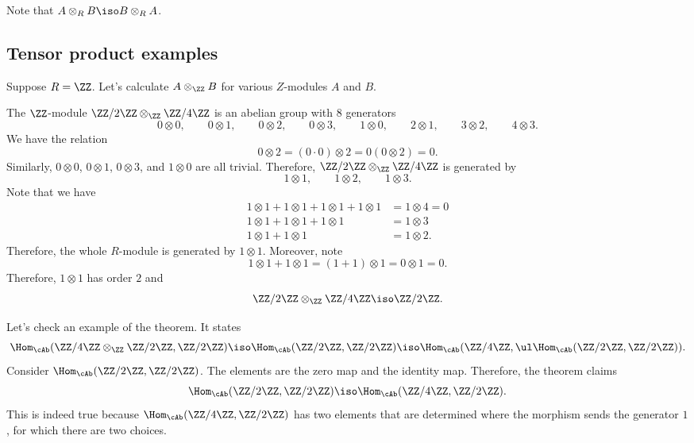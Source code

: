 \documentclass{standalone}
\begin{document}
Note that \(A \otimes_R B \iso B \otimes_R A\).

\subsection{Tensor product examples}
Suppose \(R = \ZZ\). Let's calculate \(A \otimes_\ZZ B\) for various
\(Z\)-modules \(A\) and \(B\).

\begin{example}
  The \(\ZZ\)-module \(\ZZ/2\ZZ \otimes_\ZZ \ZZ/4\ZZ\) is an abelian group
  with \(8\) generators
  \[
    0 \otimes 0, \qquad
    0 \otimes 1, \qquad
    0 \otimes 2, \qquad
    0 \otimes 3, \qquad
    1 \otimes 0, \qquad
    2 \otimes 1, \qquad
    3 \otimes 2, \qquad
    4 \otimes 3.
  \]
  We have the relation
  \[
    0 \otimes 2 = (0 \cdot 0) \otimes 2 = 0 (0 \otimes 2) = 0.
  \]
  Similarly, \(0 \otimes 0\), \(0 \otimes 1\), \(0 \otimes 3\), and
  \(1 \otimes 0\) are all trivial.
  Therefore, \(\ZZ/2\ZZ \otimes_\ZZ \ZZ/4\ZZ\) is generated by
  \[
    1 \otimes 1, \qquad
    1 \otimes 2, \qquad
    1 \otimes 3.
  \]
  Note that we have
  \begin{align*}
    1 \otimes 1 + 1 \otimes 1 + 1 \otimes 1 + 1 \otimes 1 &= 1 \otimes 4 = 0 \\
    1 \otimes 1 + 1 \otimes 1 + 1 \otimes 1 &= 1 \otimes 3 \\
    1 \otimes 1 + 1 \otimes 1 &= 1 \otimes 2.
  \end{align*}
  Therefore, the whole \(R\)-module is generated by \(1 \otimes 1\).
  Moreover, note
  \[
    1 \otimes 1 + 1 \otimes 1 = (1 + 1) \otimes 1 = 0 \otimes 1 = 0.
  \]
  Therefore, \(1 \otimes 1\) has order \(2\) and
  \[
    \ZZ/2\ZZ \otimes_\ZZ \ZZ/4\ZZ \iso \ZZ/2\ZZ.
  \]
\end{example}

Let's check an example of the theorem. It states
\[
  \Hom_\cAb(\ZZ/4\ZZ \otimes_\ZZ \ZZ/2\ZZ, \ZZ/2\ZZ)
    \iso \Hom_\cAb(\ZZ/2\ZZ, \ZZ/2\ZZ)
    \iso \Hom_\cAb(\ZZ/4\ZZ, \ul\Hom_\cAb(\ZZ/2\ZZ, \ZZ/2\ZZ)).
\]
Consider \(\Hom_\cAb(\ZZ/2\ZZ, \ZZ/2\ZZ)\).
The elements are the zero map and the identity map.
Therefore, the theorem claims
\[
  \Hom_\cAb(\ZZ/2\ZZ, \ZZ/2\ZZ) \iso \Hom_\cAb(\ZZ/4\ZZ, \ZZ/2\ZZ).
\]
This is indeed true because \(\Hom_\cAb(\ZZ/4\ZZ, \ZZ/2\ZZ)\) has two elements
that are determined where the morphism sends the generator \(1\), for which
there are two choices.
\end{document}
